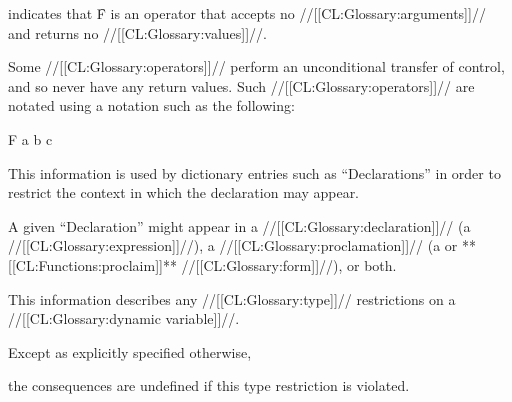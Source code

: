  {\noargs} {\novalues}

indicates that \f{F} is an operator that accepts no //[[CL:Glossary:arguments]]// and returns no //[[CL:Glossary:values]]//.

\endsubsubsubsubsection%


Some //[[CL:Glossary:operators]]// perform an unconditional transfer of control, and so never have any return values.  Such //[[CL:Glossary:operators]]// are notated using a notation such as the following:

\DefunNoReturn F {a b c}

\endsubsubsubsubsection%

\endsubsubsubsection%

\endsubsubsection%


This information is used by dictionary entries such as ``Declarations'' in order to restrict the context in which the declaration may appear.

A given ``Declaration'' might appear in 
     a //[[CL:Glossary:declaration]]// (\ie a  //[[CL:Glossary:expression]]//),
     a //[[CL:Glossary:proclamation]]// (\ie a  or **[[CL:Functions:proclaim]]** //[[CL:Glossary:form]]//),
  or both.

\endsubsubsection%


This information describes any //[[CL:Glossary:type]]// restrictions on a //[[CL:Glossary:dynamic variable]]//.

Except as explicitly specified otherwise,

the consequences are undefined if this type restriction is violated.

\endsubsubsection%

\endsubSection%
